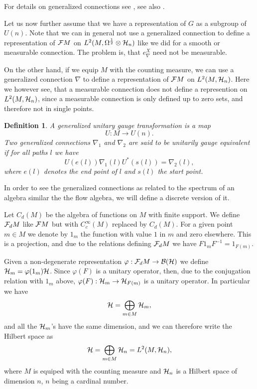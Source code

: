 \documentclass[12pt]{article}
\def\cb{{\cal B}}
\def\cf{{\cal F}}
\def\ch{{\cal H}}
\newtheorem{definition}[thm]{Definition}
\newcommand{\cF}{{\cal F}}
\begin{document}
For details on generalized connections see \cite{AshtekarLewandowski1,MarolfMourao}, see also \cite{AastrupGrimstrup2}. 

Let us now further assume that we have a  representation of $G$ as a subgroup of $U(n)$. Note that we can in general not  use a generalized connection to define a representation of $\cf M$ on $L^2(M, \Omega^{\frac12} \otimes \ch_n )$ like we did for a smooth or measurable connection. The problem is, that $e^X_\nabla$ need not  be measurable. 

On the other hand, if we equip $M$ with the counting measure, we can use a generalized connection $\nabla$ to define a representation of $\cf M$
on $L^2(M, \ch_n)$. Here we however see, that a measurable connection does not define a represention on $L^2(M,\ch_n)$, since a measurable connection is only defined up to zero sets, and therefore not in single points. 


\begin{definition}
A generalized unitary gauge transformation  is a map 
$$U:M\to U(n).$$
Two generalized connections $\nabla_1 $ and $\nabla_2$ are said to be unitarily gauge equivalent if for all paths $l$ we have
$$U(e(l)) \nabla_1(l)U^*(s(l))  =\nabla_2(l),  $$
where $e(l)$ denotes the end point of $l$ and $s(l)$ the start point.
\end{definition}

In order to see the generalized connections as related to the spectrum of an algebra similar the the flow algebra, we will define a discrete version of it. 

Let $C_d(M)$ be the algebra of functions on $M$ with finite support. We define $\cf_d M$ like $\cF M$ but with $C^\infty_c (M)$ replaced by $C_d (M)$. For a given point $m\in M$ we denote by $1_m$ the function with value $1$ in $m$ and zero elsewhere. This is a projection, and due to the relations defining $\cF_dM$ we have $F 1_m F^{-1}=1_{F(m)}  $.

Given a non-degenerate representation $\varphi :\cF_dM \to \cb (\ch ) $ we define $\ch_m=\varphi (1_m)\ch$. Since $\varphi (F)$ is a unitary operator, then, due to the conjugation relation with $1_m$ above, $\varphi (F) :\ch_m \to \ch_{F(m)}$ is a unitary operator. In particular we have 
$$\ch =\bigoplus_{m\in M}   \ch_m ,$$
and all the $\ch_m$'s have the same dimension, and we can therefore write the Hilbert space as
$$ \ch =\bigoplus_{m\in M}   \ch_n  =L^2(M,\ch_n),$$ 
where $M$ is equiped with the counting measure and $\ch_n$ is a Hilbert space of dimension $n$, $n$ being a cardinal number.
\end{document}
